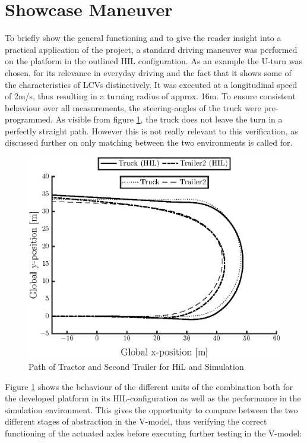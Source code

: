 \documentclass[root.tex]{subfiles}
\begin{document}
	
	{\pagestyle{empty}}
	\section{Showcase Maneuver}
	\label{chap:Showcase_Maneuver}
	To briefly show the general functioning and to give the reader insight into a practical application of the project, a standard driving maneuver was performed on the platform in the outlined \gls{HIL} configuration. As an example the U-turn was chosen, for its relevance in everyday driving and the fact that it shows some of the characteristics of \glspl{LCV} distinctively. It was executed at a longitudinal speed of 2\unit{m/s}, thus resulting in a turning radius of approx. 16\unit{m}. To ensure consistent behaviour over all measurements, the steering-angles of the truck were pre-programmed. As visible from figure \ref{fig:Path}, the truck does not leave the turn in a perfectly straight path. However this is not really relevant to this verification, as discussed further on only matching between the two environments is called for.
	
	\begin{figure}[!h]
		
		\includegraphics[width=1\linewidth]{xy_HIL_and_VTM}
		\caption[Path of Tractor and Second Trailer for HiL and Simulation]{Path of Tractor and Second Trailer for HiL and Simulation}
		
		\label{fig:Path}
	\end{figure}
	
	
	Figure \ref{fig:Path} shows the behaviour of the different units of the combination both for the developed platform in its \gls{HIL}-configuration as well as the performance in the simulation environment. This gives the opportunity to compare between the two different stages of abstraction in the V-model, thus verifying the correct functioning of the actuated axles before executing further testing in the V-model:
	
\end{document}
